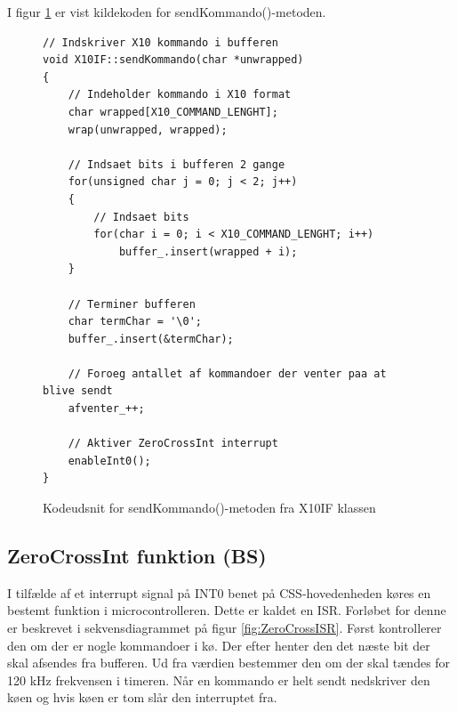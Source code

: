 I figur \ref{list:X10_sendkommando_source} er vist kildekoden for sendKommando()-metoden.

\begin{figure}[!htb]
\lstset{language=C++}
\begin{lstlisting}
// Indskriver X10 kommando i bufferen
void X10IF::sendKommando(char *unwrapped)
{
	// Indeholder kommando i X10 format
	char wrapped[X10_COMMAND_LENGHT];
	wrap(unwrapped, wrapped);
	
	// Indsaet bits i bufferen 2 gange
	for(unsigned char j = 0; j < 2; j++)
	{
		// Indsaet bits
		for(char i = 0; i < X10_COMMAND_LENGHT; i++)
			buffer_.insert(wrapped + i);
	}
	
	// Terminer bufferen
	char termChar = '\0';
	buffer_.insert(&termChar);
	
	// Foroeg antallet af kommandoer der venter paa at blive sendt
	afventer_++;
	
	// Aktiver ZeroCrossInt interrupt
	enableInt0();
}
\end{lstlisting}
\caption{Kodeudsnit for sendKommando()-metoden fra X10IF klassen}
\label{list:X10_sendkommando_source}
\end{figure}


\subsection{ZeroCrossInt funktion (BS)}
I tilfælde af et interrupt signal på INT0 benet på CSS-hovedenheden køres en bestemt funktion i microcontrolleren. Dette er kaldet en ISR. Forløbet for denne er beskrevet i sekvensdiagrammet på figur \ref{fig:ZeroCrossISR}.
Først kontrollerer den om der er nogle kommandoer i kø. Der efter henter den det næste bit der skal afsendes fra bufferen. Ud fra værdien bestemmer den om der skal tændes for 120 kHz frekvensen i timeren. Når en kommando er helt sendt nedskriver den køen og hvis køen er tom slår den interruptet fra.

